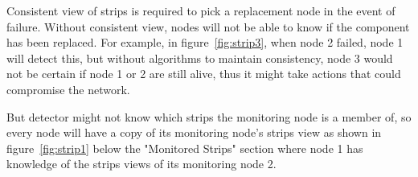 Consistent view of strips is required to pick a replacement node in the event
of failure. Without consistent view, nodes will not be able to know if the
component has been replaced.
For example, in figure~\ref{fig:strip3}, when node 2 failed, node 1 will detect
this, but without algorithms to maintain consistency, node 3 would not be
certain if node 1 or 2 are still alive, thus it might take actions that could
compromise the network.

But detector might not know which strips the monitoring node is a member of, so
every node will have a copy of its monitoring node's strips view as shown in
figure~\ref{fig:strip1} below the "Monitored Strips" section where node 1 has
knowledge of the strips views of its monitoring node 2.


